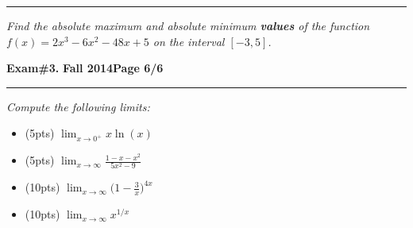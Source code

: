 \documentclass[12pt]{article}
\begin{document}
\vspace{10cm}
\hrule
{\problem[10pts] \em Find the absolute maximum and absolute minimum \textbf{values} of the function $f(x)=2x^3-6x^2-48x+5$ on the interval $[-3,5]$.}
\newpage


\hfill{\large\bf Exam\#3.}\hfill{\large\bf
  Fall 2014}\hfill{\large\bf Page 6/6}\hrule

\bigskip
{\problem \em Compute the following limits:}
\begin{itemize}
  \item[] (5pts) $\displaystyle{\lim_{x\to 0^+} x \ln (x)}$
  \vspace{3cm}
  \item[] (5pts) $\displaystyle{\lim_{x\to\infty} \frac{1-x-x^2}{5x^2-9}}$
  \vspace{3cm}
  \item[] (10pts) $\displaystyle{\lim_{x\to\infty} \Big(1-\frac{3}{x} \Big)^{4x}}$
  \vspace{6cm}
  \item[] (10pts) $\displaystyle{\lim_{x\to\infty} x^{1/x}}$
\end{itemize}
\end{document}
